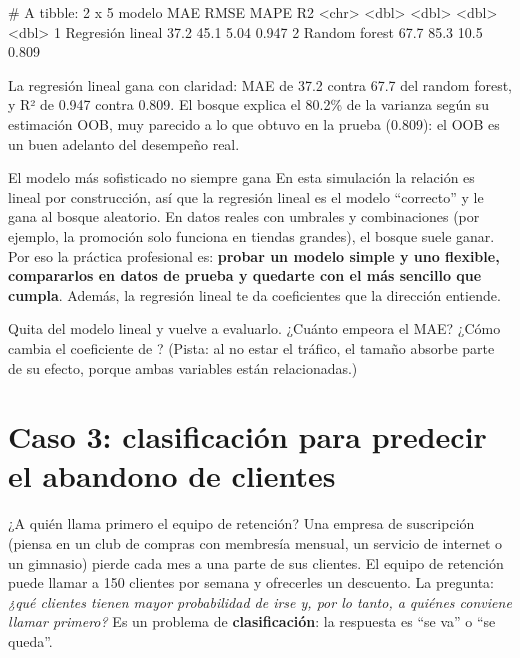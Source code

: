 \begin{rsalida}
# A tibble: 2 x 5
  modelo             MAE  RMSE  MAPE    R2
  <chr>            <dbl> <dbl> <dbl> <dbl>
1 Regresión lineal  37.2  45.1  5.04 0.947
2 Random forest     67.7  85.3 10.5  0.809
\end{rsalida}

La regresión lineal gana con claridad: MAE de 37.2 contra 67.7 del random
forest, y R² de 0.947 contra 0.809. El bosque explica el 80.2\% de la varianza
según su estimación OOB, muy parecido a lo que obtuvo en la prueba (0.809): el
OOB es un buen adelanto del desempeño real.

\begin{negocio}{El modelo más sofisticado no siempre gana}
En esta simulación la relación es lineal por construcción, así que la
regresión lineal es el modelo ``correcto'' y le gana al bosque aleatorio. En
datos reales con umbrales y combinaciones (por ejemplo, la promoción solo
funciona en tiendas grandes), el bosque suele ganar. Por eso la práctica
profesional es: \textbf{probar un modelo simple y uno flexible, compararlos en
datos de prueba y quedarte con el más sencillo que cumpla}. Además, la
regresión lineal te da coeficientes que la dirección entiende.
\end{negocio}

\begin{hazlotu}
Quita  del modelo lineal y vuelve a evaluarlo. ¿Cuánto empeora
el MAE? ¿Cómo cambia el coeficiente de ? (Pista: al no estar
el tráfico, el tamaño absorbe parte de su efecto, porque ambas variables están
relacionadas.)
\end{hazlotu}

\section{Caso 3: clasificación para predecir el abandono de clientes}
\label{sec:m7-churn}

\begin{ejemplo}{¿A quién llama primero el equipo de retención?}
Una empresa de suscripción (piensa en un club de compras con membresía
mensual, un servicio de internet o un gimnasio) pierde cada mes a una parte de
sus clientes. El equipo de retención puede llamar a 150 clientes por semana y
ofrecerles un descuento. La pregunta: \emph{¿qué clientes tienen mayor
probabilidad de irse y, por lo tanto, a quiénes conviene llamar primero?} Es un
problema de \textbf{clasificación}: la respuesta es ``se va'' o ``se queda''.
\end{ejemplo}

